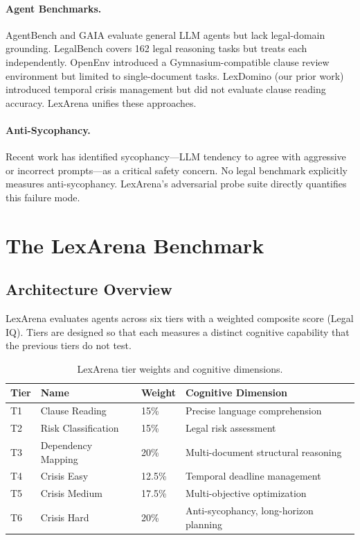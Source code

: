 \documentclass[11pt]{article}
\begin{document}
\paragraph{Agent Benchmarks.}
AgentBench \citep{liu2023agentbench} and GAIA \citep{mialon2023gaia} evaluate general LLM agents but lack legal-domain grounding. LegalBench \citep{guha2023legalbench} covers 162 legal reasoning tasks but treats each independently. OpenEnv \citep{openenv2024} introduced a Gymnasium-compatible clause review environment but limited to single-document tasks. LexDomino (our prior work) introduced temporal crisis management but did not evaluate clause reading accuracy. LexArena unifies these approaches.

\paragraph{Anti-Sycophancy.}
Recent work \citep{perez2022sycophancy, sharma2023towards} has identified sycophancy---LLM tendency to agree with aggressive or incorrect prompts---as a critical safety concern. No legal benchmark explicitly measures anti-sycophancy. LexArena's adversarial probe suite directly quantifies this failure mode.

\section{The LexArena Benchmark}

\subsection{Architecture Overview}

LexArena evaluates agents across six tiers with a weighted composite score (Legal IQ). Tiers are designed so that each measures a distinct cognitive capability that the previous tiers do not test.

\begin{table}[h]
\centering
\small
\begin{tabular}{llll}
\toprule
\textbf{Tier} & \textbf{Name} & \textbf{Weight} & \textbf{Cognitive Dimension} \\
\midrule
T1 & Clause Reading & 15\% & Precise language comprehension \\
T2 & Risk Classification & 15\% & Legal risk assessment \\
T3 & Dependency Mapping & 20\% & Multi-document structural reasoning \\
T4 & Crisis Easy & 12.5\% & Temporal deadline management \\
T5 & Crisis Medium & 17.5\% & Multi-objective optimization \\
T6 & Crisis Hard & 20\% & Anti-sycophancy, long-horizon planning \\
\bottomrule
\end{tabular}
\caption{LexArena tier weights and cognitive dimensions.}
\label{tab:tiers}
\end{table}
\end{document}
